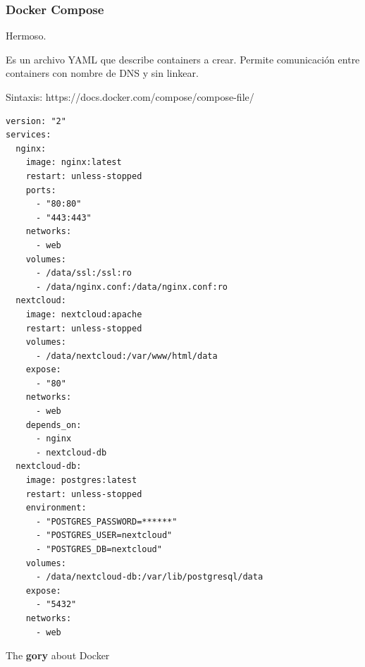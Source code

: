 \documentclass[xcolor={dvipsnames}]{beamer}
\begin{document}
\begin{frame}[fragile]
	\frametitle{Docker Compose}
	 \vspace{-0.4cm}
	\begin{multicols}{2}
	\vspace*{\fill}
	Hermoso.

	Es un archivo YAML que describe containers a crear. Permite comunicación entre containers con nombre de DNS y sin linkear.

	\scriptsize Sintaxis: https://docs.docker.com/compose/compose-file/
	\vspace*{\fill}
	\columnbreak
	\tiny \begin{verbatim}
version: "2"
services:
  nginx:
    image: nginx:latest
    restart: unless-stopped
    ports:
      - "80:80"
      - "443:443"
    networks:
      - web
    volumes:
      - /data/ssl:/ssl:ro
      - /data/nginx.conf:/data/nginx.conf:ro
  nextcloud:
    image: nextcloud:apache
    restart: unless-stopped
    volumes:
      - /data/nextcloud:/var/www/html/data
    expose:
      - "80"
    networks:
      - web
    depends_on:
      - nginx
      - nextcloud-db
  nextcloud-db:
    image: postgres:latest
    restart: unless-stopped
    environment:
      - "POSTGRES_PASSWORD=******"
      - "POSTGRES_USER=nextcloud"
      - "POSTGRES_DB=nextcloud"
    volumes:
      - /data/nextcloud-db:/var/lib/postgresql/data
    expose:
      - "5432"
    networks:
      - web
		\end{verbatim}
	\vspace*{\fill}
	\end{multicols}
\end{frame}

\begin{frame}[fragile]
	\Huge The \textbf{gory} about Docker
\end{frame}
\end{document}
